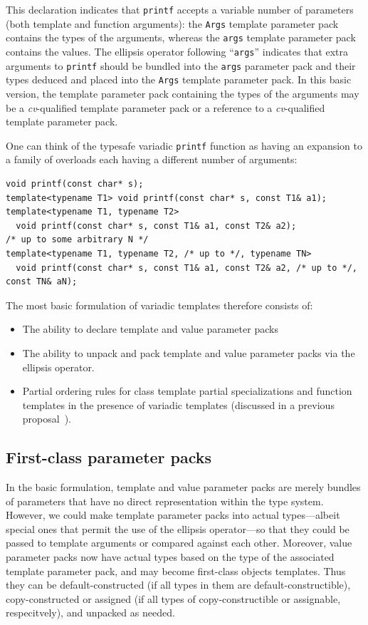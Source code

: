 \documentclass{article}
\begin{document}
This declaration indicates that \texttt{printf} accepts a variable
number of parameters (both template and function arguments): the
\texttt{Args} template parameter pack contains the types of the
arguments, whereas the \texttt{args} template parameter pack contains
the values. The ellipsis operator following ``\texttt{args}''
indicates that extra arguments to \texttt{printf} should be bundled
into the \texttt{args} parameter pack and their types deduced and
placed into the \texttt{Args} template parameter pack. In this basic
version, the template parameter pack containing the types of the
arguments may be a \textit{cv}-qualified template parameter pack or a
reference to a \textit{cv}-qualified template parameter pack. 

One can think of the typesafe variadic \texttt{printf} function as
having an expansion to a family of overloads each having a different
number of arguments:

\begin{verbatim}
void printf(const char* s);
template<typename T1> void printf(const char* s, const T1& a1);
template<typename T1, typename T2> 
  void printf(const char* s, const T1& a1, const T2& a2);
/* up to some arbitrary N */
template<typename T1, typename T2, /* up to */, typename TN> 
  void printf(const char* s, const T1& a1, const T2& a2, /* up to */, const TN& aN);
\end{verbatim}

The most basic formulation of variadic templates therefore consists
of:
\begin{itemize}
\item The ability to declare template and value parameter packs
\item The ability to unpack and pack template and value parameter
  packs via the ellipsis operator.
\item Partial ordering rules for class template partial
  specializations and function templates in the presence of variadic
  templates (discussed in a previous proposal~\cite{GJP04a}).
\end{itemize}

\subsection{First-class parameter packs}
\label{sec:first-class-pp}
In the basic formulation, template and value parameter packs are
merely bundles of parameters that have no direct representation within
the type system. However, we could make template parameter packs into
actual types---albeit special ones that permit the use of the ellipsis
operator---so that they could be passed to template arguments or
compared against each other. Moreover, value parameter packs now have
actual types based on the type of the associated template parameter
pack, and may become first-class objects templates. Thus they can be
default-constructed (if all types in them are default-constructible),
copy-constructed or assigned (if all types of copy-constructible or
assignable, respecitvely), and unpacked as needed. 
\end{document}
